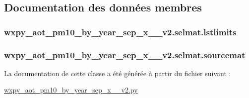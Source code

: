 \subsection{Documentation des données membres}
\hypertarget{classwxpy__aot__pm10__by__year__sep__x__2009__v2_1_1selmat_a7fec5adb0cd9a35b68ba77e044603c29}{
\subsubsection[{lstlimits}]{\setlength{\rightskip}{0pt plus 5cm}wxpy\-\_\-aot\-\_\-pm10\-\_\-by\-\_\-year\-\_\-sep\-\_\-x\-\_\-\_\-v2.\-selmat.\-lstlimits}}\label{classwxpy__aot__pm10__by__year__sep__x__2009__v2_1_1selmat_a7fec5adb0cd9a35b68ba77e044603c29}
\hypertarget{classwxpy__aot__pm10__by__year__sep__x__2009__v2_1_1selmat_a15e02ca0f998d05c6eb07057f7547265}{
\subsubsection[{sourcemat}]{\setlength{\rightskip}{0pt plus 5cm}wxpy\-\_\-aot\-\_\-pm10\-\_\-by\-\_\-year\-\_\-sep\-\_\-x\-\_\-\_\-v2.\-selmat.\-sourcemat}}\label{classwxpy__aot__pm10__by__year__sep__x__2009__v2_1_1selmat_a15e02ca0f998d05c6eb07057f7547265}


La documentation de cette classe a été générée à partir du fichier suivant \-:\begin{DoxyCompactItemize}
\item 
\hyperlink{wxpy__aot__pm10__by__year__sep__x__2009__v2_8py}{wxpy\-\_\-aot\-\_\-pm10\-\_\-by\-\_\-year\-\_\-sep\-\_\-x\-\_\-\_\-v2.\-py}\end{DoxyCompactItemize}
